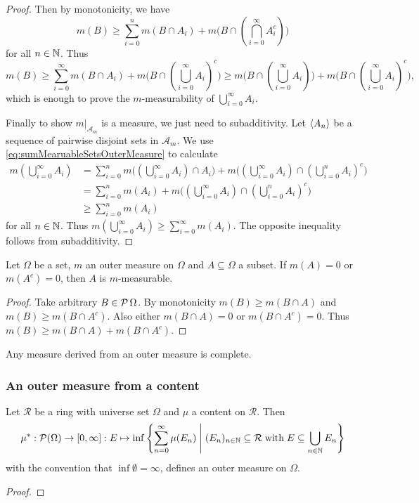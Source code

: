 \begin{proof}
Then by monotonicity, we have
\[ m(B) \geq \sum_{i=0}^nm(B\cap A_i) + m\big(B\cap (\bigcap_{i=0}^\infty A_i^c)\big) \]
for all $n\in \mathbb{N}$. Thus
\[ m(B) \geq \sum_{i=0}^\infty m(B\cap A_i) + m\big(B\cap (\bigcup_{i=0}^\infty A_i)^c\big) \geq m\big(B\cap (\bigcup_{i=0}^\infty A_i)\big) + m\big(B\cap (\bigcup_{i=0}^\infty A_i)^c\big), \]
which is enough to prove the $m$-measurability of $\bigcup_{i=0}^\infty A_i$.

Finally to show $m|_{\mathcal{A}_m}$ is a measure, we just need to subadditivity. Let $\left\langle A_n \right\rangle$ be a sequence of pairwise disjoint sets in $\mathcal{A}_m$. We use \eqref{eq:sumMearuableSetsOuterMeasure} to calculate
\begin{align*}
m(\bigcup_{i=0}^\infty A_i) &= \sum_{i=0}^nm\big((\bigcup_{i=0}^\infty A_i)\cap A_i\big) + m\big((\bigcup_{i=0}^\infty A_i)\cap (\bigcup_{i=0}^nA_i)^c\big) \\
&= \sum_{i=0}^nm(A_i) + m\big((\bigcup_{i=0}^\infty A_i)\cap (\bigcup_{i=0}^nA_i)^c\big) \\
&\geq \sum_{i=0}^nm(A_i)
\end{align*}
for all $n\in \mathbb{N}$. Thus $m(\bigcup_{i=0}^\infty A_i) \geq \sum_{i=0}^\infty m(A_i)$. The opposite inequality follows from subadditivity.
\end{proof}


\begin{lemma}
Let $\Omega$ be a set, $m$ an outer measure on $\Omega$ and $A\subseteq \Omega$ a subset. If $m(A) = 0$ or $m(A^c) = 0$, then $A$ is $m$-measurable.
\end{lemma}
\begin{proof}
Take arbitrary $B\in\operatorname{\mathcal{P}}{\Omega}$. By monotonicity $m(B) \geq m(B\cap A)$ and $m(B) \geq m(B\cap A^c)$. Also either $m(B\cap A) = 0$ or $m(B\cap A^c) = 0$. Thus $m(B) \geq m(B\cap A) + m(B\cap A^c)$.
\end{proof}
\begin{corollary}
Any measure derived from an outer measure is complete.
\end{corollary}

\subsubsection{An outer measure from a content}
\begin{proposition}
Let $\mathcal{R}$ be a ring with universe set $\Omega$ and $\mu$ a content on $\mathcal{R}$. Then
\[ \mu^*: \operatorname{\mathcal{P}}(\Omega)\to [0,\infty]: E\mapsto \inf\left\{ \sum^\infty_{n=0}\mu(E_n) \;\middle|\; (E_n)_{n\in\mathbb{N}}\subseteq \mathcal{R}\;\text{with}\;E\subseteq \bigcup_{n\in\mathbb{N}}E_n \right\} \]
with the convention that $\inf\emptyset = \infty$, defines an outer measure on $\Omega$.
\end{proposition}
\begin{proof}

\end{proof}


